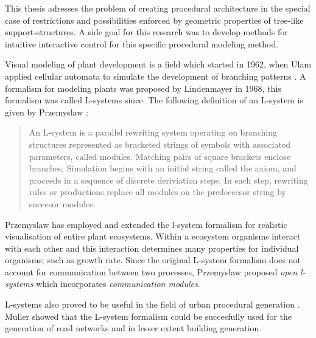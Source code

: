 This thesis adresses the problem of creating procedural architecture in the special case of restrictions and possibilities enforced by geometric properties of tree-like support-structures. A side goal for this research was to develop methods for intuitive interactive control for this specific procedural modeling method. 



Visual modeling of plant development is a field which started in 1962, when Ulam applied cellular automata to 
simulate the development of branching patterns \citep{PrzemyslawPlants}. A formalism for modeling plants was proposed by Lindenmayer 
in 1968, this formalism was called L-systems since. The following definition of an L-system is given by Przemyslaw \citep{PrzemyslawPlants}: 

\begin{quote}
An L-system is a parallel rewriting system operating on branching structures represented as bracketed strings of symbols with associated parameters, called modules. Matching pairs of square brackets enclose branches. Simulation begins with an  initial string called the axiom, and proceeds in a sequence of discrete deriviation steps. In each step, rewriting rules or productions replace all modules on the predeccesor string by succesor modules.   
\end{quote}   

Przemyslaw \citep{PrzemyslawPlants} has employed and extended the l-system formalism for realistic visualisation of entire plant ecosystems. Within a ecosystem organisms interact with each other and this interaction determines many properties for individual organisms; such as growth rate. Since the original L-system formalism does not account for communication between two processes, Przemyslaw proposed \emph{open l-systems} which incorporates \emph{communication modules}.    
  
L-systems also proved to be useful in the field of urban procedural generation \citep{Wonka03}. 
Muller showed that the L-system formalism could be succesfully used for the generation of road networks and in lesser extent building generation. 

